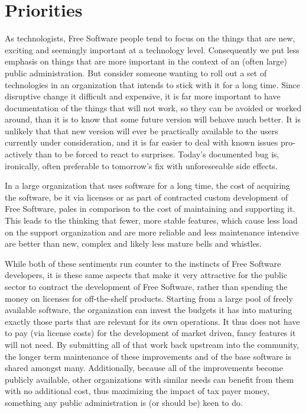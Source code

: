 \section*{Priorities}

As technologists, Free Software people tend to focus on the things that are
new, exciting and seemingly important at a technology level. Consequently we
put less emphasis on things that are more important in the context of an (often
large) public administration. But consider someone wanting to roll out a
set of technologies in an organization that intends to stick with it for a long
time. Since disruptive change it difficult and expensive, it is far more
important to have documentation of the things that will not work, so they can
be avoided or worked around, than it is to know that some future version will
behave much better. It is unlikely that that new version will ever be
practically available to the users currently under consideration, and it is far
easier to deal with known issues pro-actively than to be forced to react to
surprises.  Today's documented bug is, ironically, often preferable to
tomorrow's fix with unforeseeable side effects.

In a large organization that uses software for a long time, the cost of acquiring
the software, be it via licenses or as part of contracted custom development of
Free Software, pales in comparison to the cost of maintaining and supporting it.
This leads to the thinking that fewer, more stable features, which cause less load
on the support organization and are more reliable and less maintenance intensive
are better than new, complex and likely less mature bells and whistles.

While both of these sentiments run counter to the instincts of Free Software
developers, it is these same aspects that make it very attractive for the
public sector to contract the development of Free Software, rather than
spending the money on licenses for off-the-shelf products. Starting from a
large pool of freely available software, the organization can invest the
budgets it has into maturing exactly those parts that are relevant for its own
operations. It thus does not have to pay (via license costs) for the development of
market driven, fancy features it will not need. By submitting all of that work
back upstream into the community, the longer term maintenance of these
improvements and of the base software is shared amongst many. Additionally,
because all of the improvements become publicly available, other
organizations with similar needs can benefit from them with no
additional cost, thus maximizing the impact of tax payer money,
something any public administration is (or should be) keen to do.

